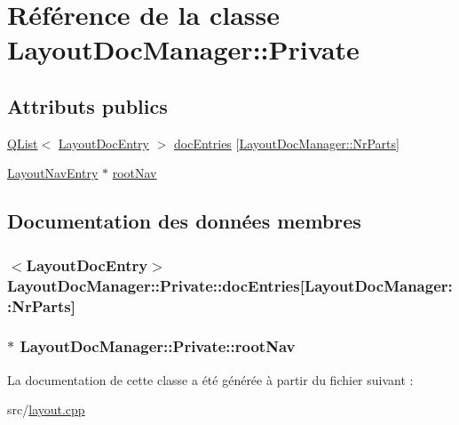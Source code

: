 \hypertarget{class_layout_doc_manager_1_1_private}{}\section{Référence de la classe Layout\+Doc\+Manager\+:\+:Private}
\label{class_layout_doc_manager_1_1_private}
\subsection*{Attributs publics}
\begin{DoxyCompactItemize}
\item 
\hyperlink{class_q_list}{Q\+List}$<$ \hyperlink{struct_layout_doc_entry}{Layout\+Doc\+Entry} $>$ \hyperlink{class_layout_doc_manager_1_1_private_a5ce5a0b7681f897515310eb642f3d9df}{doc\+Entries} \mbox{[}\hyperlink{class_layout_doc_manager_aee13a925ea1f915c542ecd7f579ebc94a5d59ec29416e7a603f2a68ee9e718ed5}{Layout\+Doc\+Manager\+::\+Nr\+Parts}\mbox{]}
\item 
\hyperlink{struct_layout_nav_entry}{Layout\+Nav\+Entry} $\ast$ \hyperlink{class_layout_doc_manager_1_1_private_aeac2fc7fec3be235d87c5c6418ce5732}{root\+Nav}
\end{DoxyCompactItemize}


\subsection{Documentation des données membres}
\hypertarget{class_layout_doc_manager_1_1_private_a5ce5a0b7681f897515310eb642f3d9df}{}
\subsubsection[{doc\+Entries}]{$<${\bf Layout\+Doc\+Entry}$>$ Layout\+Doc\+Manager\+::\+Private\+::doc\+Entries\mbox{[}{\bf Layout\+Doc\+Manager\+::\+Nr\+Parts}\mbox{]}}\label{class_layout_doc_manager_1_1_private_a5ce5a0b7681f897515310eb642f3d9df}
\hypertarget{class_layout_doc_manager_1_1_private_aeac2fc7fec3be235d87c5c6418ce5732}{}
\subsubsection[{root\+Nav}]{$\ast$ Layout\+Doc\+Manager\+::\+Private\+::root\+Nav}\label{class_layout_doc_manager_1_1_private_aeac2fc7fec3be235d87c5c6418ce5732}


La documentation de cette classe a été générée à partir du fichier suivant \+:\begin{DoxyCompactItemize}
\item 
src/\hyperlink{layout_8cpp}{layout.\+cpp}\end{DoxyCompactItemize}
